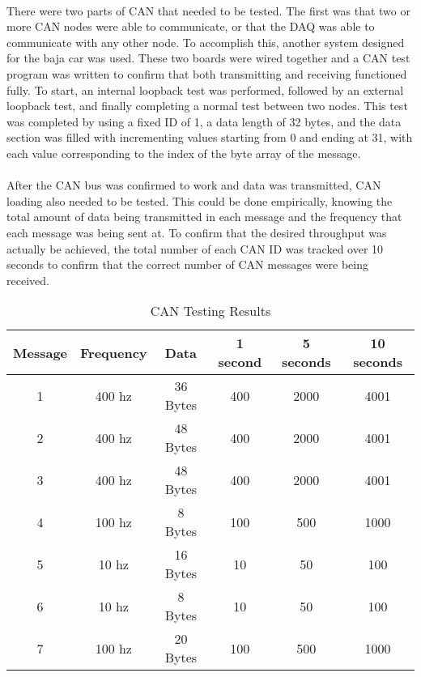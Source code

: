 \paragraph{}
There were two parts of CAN that needed to be tested.
The first was that two or more CAN nodes were able to communicate, or that the DAQ was able to communicate with any other node.
To accomplish this, another system designed for the baja car was used.
These two boards were wired together and a CAN test program was written to confirm that both transmitting and receiving functioned fully.
To start, an internal loopback test was performed, followed by an external loopback test, and finally completing a normal test between two nodes.
This test was completed by using a fixed ID of 1, a data length of 32 bytes, and the data section was filled with incrementing values starting from 0 and ending at 31, with each value corresponding to the index of the byte array of the message.

\paragraph{}
After the CAN bus was confirmed to work and data was transmitted, CAN loading also needed to be tested.
This could be done empirically, knowing the total amount of data being transmitted in each message and the frequency that each message was being sent at.
To confirm that the desired throughput was actually be achieved, the total number of each CAN ID was tracked over 10 seconds to confirm that the correct number of CAN messages were being received.

\begin{table}[H] \label{tab:CANTesting}
\caption{CAN Testing Results}
\centering
\begin{tabular}{c c c c c c}
\hline\hline
Message & Frequency & Data & 1 second & 5 seconds & 10 seconds \\ [0.5ex]
\hline
1 & 400 hz & 36 Bytes & 400 & 2000 & 4001 \\
2 & 400 hz & 48 Bytes & 400 & 2000 & 4001 \\
3 & 400 hz & 48 Bytes & 400 & 2000 & 4001 \\
4 & 100 hz & 8 Bytes & 100 & 500 & 1000 \\
5 & 10 hz & 16 Bytes & 10 & 50 & 100 \\
6 & 10 hz & 8 Bytes & 10 & 50 & 100 \\
7 & 100 hz & 20 Bytes & 100 & 500 & 1000 \\ [1ex]
\hline
\end{tabular}
\end{table}

